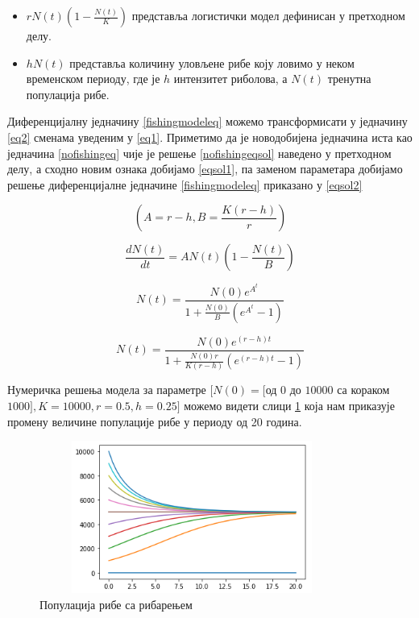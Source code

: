 \documentclass[a4paper]{article}
\begin{document}
{\begin{itemize}
  \item $ rN(t)\left(1-\frac{N(t)}{K}\right)$ представља логистички модел дефинисан у претходном делу.
  \item $hN(t)$  представља количину уловљене рибе коју ловимо у неком временском периоду, где је $h$ интензитет риболова, а $N(t)$ тренутна популација рибе.
\end{itemize}
Диференцијалну једначину \ref{fishingmodeleq} можемо трансформисати у једначину \ref{eq2} сменама уведеним у \ref{eq1}. Приметимо да је новодобијена једначина иста као једначина \ref{nofishingeq} чије је решење \ref{nofishingeqsol} наведено у претходном делу, а сходно новим ознака добијамо \ref{eqsol1}, па заменом параметара добијамо решење диференцијалне једначине \ref{fishingmodeleq} приказано у \ref{eqsol2}

\begin{equation}
    \label{eq1}
    \left(A = r-h, B = \frac{K(r-h)}{r}\right)
\end{equation}

\begin{equation}
    \label{eq2}
    \frac{dN(t)}{dt} = AN(t)\left(1-\frac{N(t)}{B}\right)
\end{equation}

\begin{equation}
    \label{eqsol1}
    N(t) = \frac{N(0)e^A^t}{1+\frac{N(0)}{B}(e^A^t - 1)}
\end{equation}

\begin{equation}
    \label{eqsol2}
    N(t) = \frac{N(0)e^{(r-h)t}}{1+\frac{N(0)r}{K(r-h)}(e^{(r-h)t} - 1)}
\end{equation}

Нумеричка решења модела за параметре $[N(0)=[$од $0$ до $10000$ са кораком $1000],  K=10000, r=0.5, h=0.25] $ можемо видети слици \ref{fishingmodel_view} која нам приказује промену величине популације рибе у периоду од 20 година.

 \begin{figure}[h!]
	\centering
	\includegraphics[width=10cm,height=5cm]{images/FishingModel.png}
	\caption{Популација рибе са рибарењем}
	\label{fishingmodel_view}
\end{figure}

}
\end{document}
